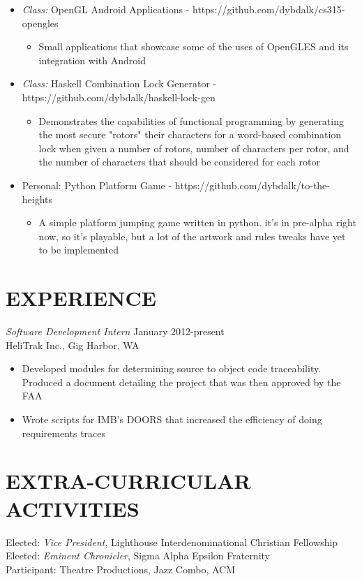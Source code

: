\documentclass[margin]{res}
\begin{document}
\begin{resume}
\begin{itemize}
\begin{itemize}
	\end{itemize}
	\item {\sl Class:} OpenGL Android Applications - https://github.com/dybdalk/cs315-opengles
	\begin{itemize}
	\item Small applications that showcase some of the uses of OpenGLES and its integration with Android
	\end{itemize}
	\item {\sl Class:} Haskell Combination Lock Generator - https://github.com/dybdalk/haskell-lock-gen
	\begin{itemize}
	\item Demonstrates the capabilities of functional programming by generating the most secure "rotors" their characters for a word-based combination lock when given a number of rotors, number of characters per rotor, and the number of characters that should be considered for each rotor
	\end{itemize}
	\item {Personal:} Python Platform Game - https://github.com/dybdalk/to-the-heights
	\begin{itemize}
	\item A simple platform jumping game written in python. it's in pre-alpha right now, so it's playable, but a lot of the artwork and rules tweaks have yet to be implemented
	\end{itemize}
	
\end{itemize}						
 
\section{EXPERIENCE} {\sl Software Development Intern} \hfill January 2012-present \\ 
                HeliTrak Inc., Gig Harbor, WA 
                 \begin{itemize}  \itemsep -2pt %
                 \item   Developed modules for determining source to object code traceability. Produced a document detailing the project that was then approved by the FAA
                \item   Wrote scripts for IMB's DOORS that increased the efficiency of doing requirements traces
                \end{itemize}

\section{EXTRA-CURRICULAR \\ ACTIVITIES}             
            Elected: {\it Vice President}, Lighthouse Interdenominational Christian Fellowship \\
            Elected: {\it Eminent Chronicler}, Sigma Alpha Epsilon Fraternity \\
           	Participant: Theatre Productions, Jazz Combo, ACM
 

\end{resume}
\end{document}
